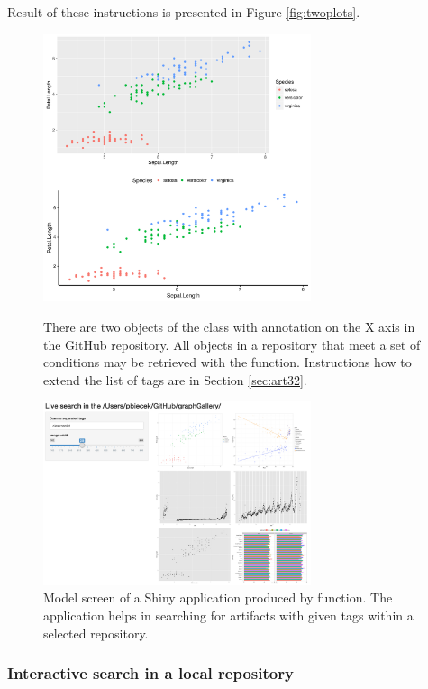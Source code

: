 \documentclass[nojss]{jss}\usepackage[]{graphicx}\usepackage[]{color}
\begin{document}
Result of these instructions is presented in Figure \ref{fig:twoplots}.

\begin{figure}[h!]
\centering
\includegraphics[width=0.7\textwidth]{Figures/arrange_02.pdf}
\caption{\label{fig:twoplots}There are two objects of the class  with annotation  on the {X} axis in the GitHub  repository. All objects in a repository that meet a set of conditions may be retrieved with the  function. {Instructions how to extend the list of tags are in Section \ref{sec:art32}.}}

\centering
\includegraphics[width=0.7\textwidth]{Figures/shinySearch.png}
\caption{\label{fig:shinyapp}Model screen of a Shiny application produced by  function. The application helps in searching for artifacts with given tags within a selected repository.}
\end{figure}


\subsubsection{Interactive search in a local repository}
\end{document}
